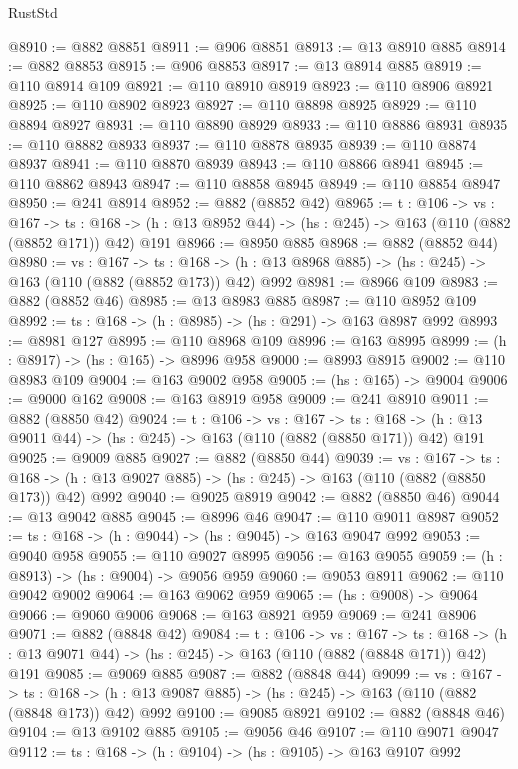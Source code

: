 \begin{lexlean}{RustStd}
\begin{coremodule}
@8910 := @882 @8851
@8911 := @906 @8851
@8913 := @13 @8910 @885
@8914 := @882 @8853
@8915 := @906 @8853
@8917 := @13 @8914 @885
@8919 := @110 @8914 @109
@8921 := @110 @8910 @8919
@8923 := @110 @8906 @8921
@8925 := @110 @8902 @8923
@8927 := @110 @8898 @8925
@8929 := @110 @8894 @8927
@8931 := @110 @8890 @8929
@8933 := @110 @8886 @8931
@8935 := @110 @8882 @8933
@8937 := @110 @8878 @8935
@8939 := @110 @8874 @8937
@8941 := @110 @8870 @8939
@8943 := @110 @8866 @8941
@8945 := @110 @8862 @8943
@8947 := @110 @8858 @8945
@8949 := @110 @8854 @8947
@8950 := @241 @8914
@8952 := @882 (@8852 @42)
@8965 := {t : @106} ->
  {vs : @167} ->
  {ts : @168} -> (h : @13 @8952 @44) -> (hs : @245) -> @163 (@110 (@882 (@8852 @171)) @42) @191
@8966 := @8950 @885
@8968 := @882 (@8852 @44)
@8980 := {vs : @167} ->
  {ts : @168} -> (h : @13 @8968 @885) -> (hs : @245) -> @163 (@110 (@882 (@8852 @173)) @42) @992
@8981 := @8966 @109
@8983 := @882 (@8852 @46)
@8985 := @13 @8983 @885
@8987 := @110 @8952 @109
@8992 := {ts : @168} -> (h : @8985) -> (hs : @291) -> @163 @8987 @992
@8993 := @8981 @127
@8995 := @110 @8968 @109
@8996 := @163 @8995
@8999 := (h : @8917) -> (hs : @165) -> @8996 @958
@9000 := @8993 @8915
@9002 := @110 @8983 @109
@9004 := @163 @9002 @958
@9005 := (hs : @165) -> @9004
@9006 := @9000 @162
@9008 := @163 @8919 @958
@9009 := @241 @8910
@9011 := @882 (@8850 @42)
@9024 := {t : @106} ->
  {vs : @167} ->
  {ts : @168} -> (h : @13 @9011 @44) -> (hs : @245) -> @163 (@110 (@882 (@8850 @171)) @42) @191
@9025 := @9009 @885
@9027 := @882 (@8850 @44)
@9039 := {vs : @167} ->
  {ts : @168} -> (h : @13 @9027 @885) -> (hs : @245) -> @163 (@110 (@882 (@8850 @173)) @42) @992
@9040 := @9025 @8919
@9042 := @882 (@8850 @46)
@9044 := @13 @9042 @885
@9045 := @8996 @46
@9047 := @110 @9011 @8987
@9052 := {ts : @168} -> (h : @9044) -> (hs : @9045) -> @163 @9047 @992
@9053 := @9040 @958
@9055 := @110 @9027 @8995
@9056 := @163 @9055
@9059 := (h : @8913) -> (hs : @9004) -> @9056 @959
@9060 := @9053 @8911
@9062 := @110 @9042 @9002
@9064 := @163 @9062 @959
@9065 := (hs : @9008) -> @9064
@9066 := @9060 @9006
@9068 := @163 @8921 @959
@9069 := @241 @8906
@9071 := @882 (@8848 @42)
@9084 := {t : @106} ->
  {vs : @167} ->
  {ts : @168} -> (h : @13 @9071 @44) -> (hs : @245) -> @163 (@110 (@882 (@8848 @171)) @42) @191
@9085 := @9069 @885
@9087 := @882 (@8848 @44)
@9099 := {vs : @167} ->
  {ts : @168} -> (h : @13 @9087 @885) -> (hs : @245) -> @163 (@110 (@882 (@8848 @173)) @42) @992
@9100 := @9085 @8921
@9102 := @882 (@8848 @46)
@9104 := @13 @9102 @885
@9105 := @9056 @46
@9107 := @110 @9071 @9047
@9112 := {ts : @168} -> (h : @9104) -> (hs : @9105) -> @163 @9107 @992

\end{coremodule}
\end{lexlean}
